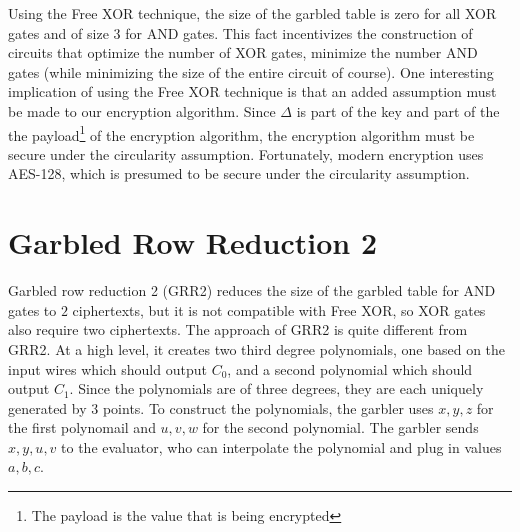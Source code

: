 \documentclass[12pt,twoside]{reedthesis}
\begin{document}
Using the Free XOR technique, the size of the garbled table is zero for all XOR gates and of size $3$ for AND gates.
This fact incentivizes the construction of circuits that optimize the number of XOR gates, minimize the number AND gates (while minimizing the size of the entire circuit of course).
One interesting implication of using the Free XOR technique is that an added assumption must be made to our encryption algorithm.
Since $\Delta$ is part of the key and part of the the payload\footnote{The payload is the value that is being encrypted} of the encryption algorithm, the encryption algorithm must be secure under the circularity assumption.
Fortunately, modern encryption uses AES-128, which is presumed to be secure under the circularity assumption.


\section{Garbled Row Reduction 2}
Garbled row reduction 2 (GRR2) reduces the size of the garbled table for AND gates to $2$ ciphertexts, but it is not compatible with Free XOR, so XOR gates also require two ciphertexts.
The approach of GRR2 is quite different from GRR2. 
At a high level, it creates two third degree polynomials, one based on the input wires which should output $C_0$, and a second polynomial which should output $C_1$.
Since the polynomials are of three degrees, they are each uniquely generated by $3$ points. 
To construct the polynomials, the garbler uses $x,y,z$ for the first polynomail and $u,v,w$ for the second polynomial.
The garbler sends $x,y,u,v$ to the evaluator, who can interpolate the polynomial and plug in values $a,b,c$.
\end{document}
